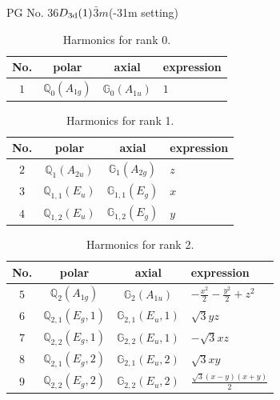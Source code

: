 \documentclass[fleqn,8pt,landscape]{jsarticle}
\begin{document}
\setcounter{MaxMatrixCols}{32}

\renewcommand{\tablename}{Table~}
\renewcommand{\figurename}{Figure~}
\begin{center}
\LARGE
PG No. 36\quad$D_{\rm 3d}(1)$\quad$\bar{3}m$\quad(-31m setting)\quad[ trigonal ]
\end{center}
\begin{table}[ht!]
\begin{center}
\caption{Harmonics for rank 0.}
\renewcommand{\arraystretch}{1.3}
\begin{tabular}{cccl} \hline \hline
No. & polar & axial & expression \\ \hline
$ 1 $ & $ \mathbb{Q}_{0}(A_{1g}) $ & $ \mathbb{G}_{0}(A_{1u}) $ & $ 1 $ \\
 \hline \hline
\end{tabular}
\end{center}
\end{table}
\begin{table}[ht!]
\begin{center}
\caption{Harmonics for rank 1.}
\renewcommand{\arraystretch}{1.3}
\begin{tabular}{cccl} \hline \hline
No. & polar & axial & expression \\ \hline
$ 2 $ & $ \mathbb{Q}_{1}(A_{2u}) $ & $ \mathbb{G}_{1}(A_{2g}) $ & $ z $ \\
$ 3 $ & $ \mathbb{Q}_{1,1}(E_{u}) $ & $ \mathbb{G}_{1,1}(E_{g}) $ & $ x $ \\
$ 4 $ & $ \mathbb{Q}_{1,2}(E_{u}) $ & $ \mathbb{G}_{1,2}(E_{g}) $ & $ y $ \\
 \hline \hline
\end{tabular}
\end{center}
\end{table}
\begin{table}[ht!]
\begin{center}
\caption{Harmonics for rank 2.}
\renewcommand{\arraystretch}{1.3}
\begin{tabular}{cccl} \hline \hline
No. & polar & axial & expression \\ \hline
$ 5 $ & $ \mathbb{Q}_{2}(A_{1g}) $ & $ \mathbb{G}_{2}(A_{1u}) $ & $ - \frac{x^{2}}{2} - \frac{y^{2}}{2} + z^{2} $ \\
$ 6 $ & $ \mathbb{Q}_{2,1}(E_{g},1) $ & $ \mathbb{G}_{2,1}(E_{u},1) $ & $ \sqrt{3} y z $ \\
$ 7 $ & $ \mathbb{Q}_{2,2}(E_{g},1) $ & $ \mathbb{G}_{2,2}(E_{u},1) $ & $ - \sqrt{3} x z $ \\
$ 8 $ & $ \mathbb{Q}_{2,1}(E_{g},2) $ & $ \mathbb{G}_{2,1}(E_{u},2) $ & $ \sqrt{3} x y $ \\
$ 9 $ & $ \mathbb{Q}_{2,2}(E_{g},2) $ & $ \mathbb{G}_{2,2}(E_{u},2) $ & $ \frac{\sqrt{3} \left(x - y\right) \left(x + y\right)}{2} $ \\
 \hline \hline
\end{tabular}
\end{center}
\end{table}
\end{document}
